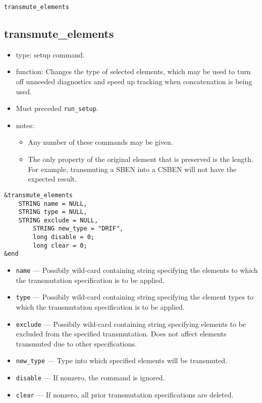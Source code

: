 \documentclass[11pt]{article}
\begin{document}
\newpage
\begin{center}{\Large\verb|transmute_elements|}\end{center}
\subsection{transmute\_elements \label{subsec:transmuteelements}}

\begin{itemize}
\item type: setup command.
\item function: Changes the type of selected elements, which may be used to
	turn off unneeded diagnostics and speed up tracking when concatenation
	is being used.
\item Must preceded \verb|run_setup|.
\item notes: 
	\begin{itemize}
	\item Any number of these commands may be given.
	\item The only property of the original element that is preserved is
	the length.  For example, transmuting a SBEN into a CSBEN will not
	have the expected result.
	\end{itemize}
\end{itemize}

\begin{verbatim}
&transmute_elements
	STRING name = NULL,
	STRING type = NULL,
	STRING exclude = NULL,
        STRING new_type = "DRIF",
        long disable = 0;
        long clear = 0;
&end
\end{verbatim}

\begin{itemize}
\item \verb|name| --- Possibily wild-card containing string specifying the
	elements to which the transmutation specification is to be applied.
\item \verb|type| --- Possibily wild-card containing string specifying the
	element types to which the transmutation specification is to be applied.
\item \verb|exclude| --- Possibily wild-card containing string specifying 
	elements to be excluded from the specified transmutation.  Does not
	affect elements transmuted due to other specifications.
\item \verb|new_type| --- Type into which specified elements will be transmuted.
\item \verb|disable| --- If nonzero, the command is ignored.
\item \verb|clear| --- If nonzero, all prior transmutation specifications are deleted.
\end{itemize}
\end{document}
